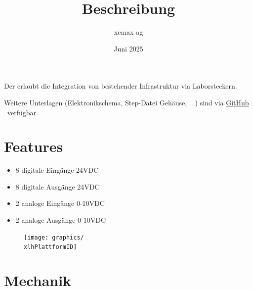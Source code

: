 \documentclass[10pt]{datasheet}
\title{Beschreibung \xlhPlattformID}
\author{xemax ag}
\date{Juni 2025}
\begin{document}
\maketitle



Der \xlhPlattformID erlaubt die Integration von bestehender Infrastruktur via Laborsteckern.

Weitere Unterlagen (Elektronikschema, Step-Datei Gehäuse, ...) sind via
\href{https://github.com/xemax-ag/xLH/}{GitHub \xlhPlattformID}\ verfügbar.

\section{Features}

\begin{itemize}
    \item 8 digitale Eingänge 24VDC
    \item 8 digitale Ausgänge 24VDC
    \item 2 analoge Eingänge 0-10VDC
    \item 2 analoge Ausgänge 0-10VDC
\end{itemize}

%
%
%

\vfill\break

\begin{figure}[h]
    \centering
    \texttt{[image: graphics/\\xlhPlattformID]}
\end{figure}

\section{Mechanik}
\end{document}
